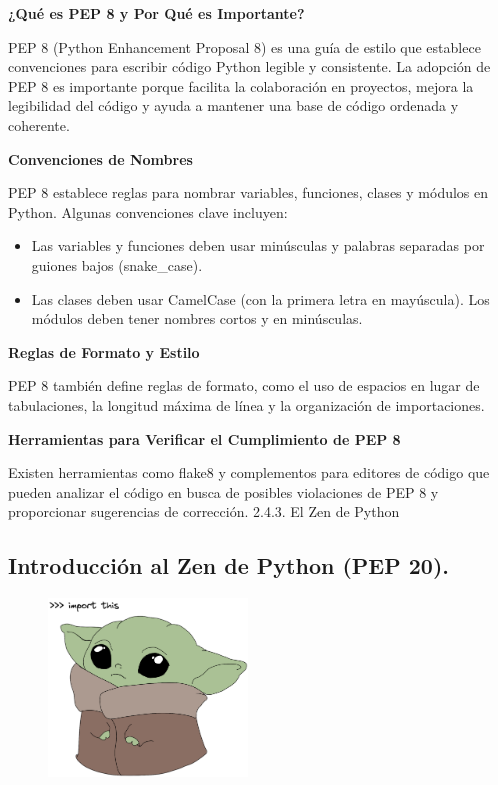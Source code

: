 \documentclass[
  a4paper,
  DIV=11,
  numbers=noendperiod,
  onepage,
  openany]{scrreprt}
\begin{document}
\textbf{¿Qué es PEP 8 y Por Qué es Importante?}

PEP 8 (Python Enhancement Proposal 8) es una guía de estilo que
establece convenciones para escribir código Python legible y
consistente. La adopción de PEP 8 es importante porque facilita la
colaboración en proyectos, mejora la legibilidad del código y ayuda a
mantener una base de código ordenada y coherente.

\textbf{Convenciones de Nombres}

PEP 8 establece reglas para nombrar variables, funciones, clases y
módulos en Python. Algunas convenciones clave incluyen:

\begin{itemize}
\item
  Las variables y funciones deben usar minúsculas y palabras separadas
  por guiones bajos (snake\_case).
\item
  Las clases deben usar CamelCase (con la primera letra en mayúscula).
  Los módulos deben tener nombres cortos y en minúsculas.
\end{itemize}

\textbf{Reglas de Formato y Estilo}

PEP 8 también define reglas de formato, como el uso de espacios en lugar
de tabulaciones, la longitud máxima de línea y la organización de
importaciones.

\textbf{Herramientas para Verificar el Cumplimiento de PEP 8}

Existen herramientas como flake8 y complementos para editores de código
que pueden analizar el código en busca de posibles violaciones de PEP 8
y proporcionar sugerencias de corrección. 2.4.3. El Zen de Python

\subsection{Introducción al Zen de Python (PEP
20).}\label{introducciuxf3n-al-zen-de-python-pep-20.}

\begin{figure}

{\centering \includegraphics[width=2.08333in,height=\textheight]{unidades/unidad1/images/import this-2.png}

}

\end{figure}
\end{document}
